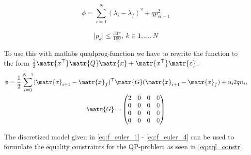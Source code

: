 \begin{equation}
    \phi = \sum_{i = 1}^{N} (\lambda_{i} - \lambda_{f})^2 + qp_{ci-1}^{2} \label{eq:cost_func}
\end{equation}

\begin{align}\label{eq:constraints}
        \mid p_k\mid\leq\frac{30\pi}{180}, \ k\in{1,...,N}
\end{align}

To use this with matlabs quadprog-function we have to rewrite the function to the form $\frac{1}{2}\matr{x^\top}\matr{Q}\matr{x} + \matr{x^\top}\matr{c}$.
\begin{subequations}\label{eq:qp_inter}
    \begin{gather}
        \phi = \frac{1}{2}\sum_{i=0}^{N-1}(\matr{x}_{i+1} - \matr{x}_{f})^\top\matr{G}(\matr{x}_{i+1} - \matr{x}_{f}) + u_{i}2qu_{i}, \\
        \matr{G} =
        \begin{pmatrix}
            2 & 0 & 0 & 0 \\
            0 & 0 & 0 & 0 \\
            0 & 0 & 0 & 0 \\
            0 & 0 & 0 & 0
        \end{pmatrix}
    \end{gather}
\end{subequations}

The discretized model given in \cref{eq:f_euler_1} - \cref{eq:f_euler_4} can be used to formulate the equality constraints for the QP-problem as seen in \cref{eq:eql_constr}.

